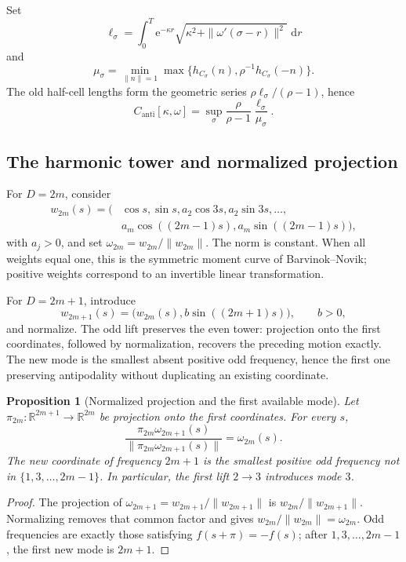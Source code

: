 \documentclass[10pt,a4paper]{article}
\newcommand{\R}{\mathbb{R}}
\newcommand{\dd}{\,\mathrm{d}}
\newcommand{\e}{\mathrm{e}}
\theoremstyle{plain}
\newtheorem{proposition}[theorem]{Proposition}
\theoremstyle{definition}
\theoremstyle{remark}
\begin{document}
Set
\[
  \ell_\sigma
  =\int_0^T \e^{-\kappa r}
   \sqrt{\kappa^2+\|\omega'(\sigma-r)\|^2}\,\dd r
\]
and
\[
  \mu_\sigma
  =\min_{\|n\|=1}
   \max\{h_{C_\sigma}(n),\rho^{-1}h_{C_\sigma}(-n)\}.
\]
The old half-cell lengths form the geometric series $\rho\ell_\sigma/(\rho-1)$, hence
\[
  C_{\mathrm{anti}}[\kappa,\omega]
  =\sup_\sigma\frac{\rho}{\rho-1}\frac{\ell_\sigma}{\mu_\sigma}.
\]

\subsection{The harmonic tower and normalized projection}

For $D=2m$, consider
\[
\begin{split}
  w_{2m}(s)=\bigl(&\cos s,\sin s,
  a_2\cos3s,a_2\sin3s,\ldots,\\
  &a_m\cos((2m-1)s),a_m\sin((2m-1)s)\bigr),
\end{split}
\]
with $a_j>0$, and set $\omega_{2m}=w_{2m}/\|w_{2m}\|$. The norm is constant. When all weights equal one, this is the symmetric moment curve of Barvinok--Novik; positive weights correspond to an invertible linear transformation.

For $D=2m+1$, introduce
\[
  w_{2m+1}(s)=\bigl(w_{2m}(s),b\sin((2m+1)s)\bigr),
  \qquad b>0,
\]
and normalize. The odd lift preserves the even tower: projection onto the first coordinates, followed by normalization, recovers the preceding motion exactly. The new mode is the smallest absent positive odd frequency, hence the first one preserving antipodality without duplicating an existing coordinate.

\begin{proposition}[Normalized projection and the first available mode]
Let $\pi_{2m}:\R^{2m+1}\to\R^{2m}$ be projection onto the first coordinates. For every $s$,
\[
  \frac{\pi_{2m}\omega_{2m+1}(s)}{\|\pi_{2m}\omega_{2m+1}(s)\|}
  =\omega_{2m}(s).
\]
The new coordinate of frequency $2m+1$ is the smallest positive odd frequency not in $\{1,3,\ldots,2m-1\}$. In particular, the first lift $2\to3$ introduces mode $3$.
\end{proposition}

\begin{proof}
The projection of $\omega_{2m+1}=w_{2m+1}/\|w_{2m+1}\|$ is $w_{2m}/\|w_{2m+1}\|$. Normalizing removes that common factor and gives $w_{2m}/\|w_{2m}\|=\omega_{2m}$. Odd frequencies are exactly those satisfying $f(s+\pi)=-f(s)$; after $1,3,\ldots,2m-1$, the first new mode is $2m+1$.
\end{proof}
\end{document}
